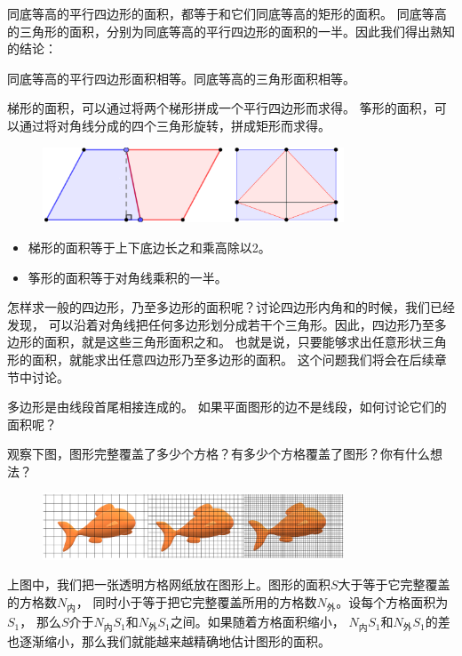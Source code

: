 \documentclass[12pt,UTF8]{ctexbook}
\begin{document}
同底等高的平行四边形的面积，都等于和它们同底等高的矩形的面积。
同底等高的三角形的面积，分别为同底等高的平行四边形的面积的一半。因此我们得出熟知的结论：
\begin{tm}
    同底等高的平行四边形面积相等。同底等高的三角形面积相等。
\end{tm}

梯形的面积，可以通过将两个梯形拼成一个平行四边形而求得。
筝形的面积，可以通过将对角线分成的四个三角形旋转，拼成矩形而求得。

\begin{figure}[H] 
    \vspace{4pt}
    \centering
    \includegraphics[width=0.8\textwidth]{tu/面积_梯形1.png}
\end{figure}

\begin{itemize}
    \item 梯形的面积等于上下底边长之和乘高除以2。
    \item 筝形的面积等于对角线乘积的一半。
\end{itemize}

怎样求一般的四边形，乃至多边形的面积呢？讨论四边形内角和的时候，我们已经发现，
可以沿着对角线把任何多边形划分成若干个三角形。因此，四边形乃至多边形的面积，就是这些三角形面积之和。
也就是说，只要能够求出任意形状三角形的面积，就能求出任意四边形乃至多边形的面积。
这个问题我们将会在后续章节中讨论。

多边形是由线段首尾相接连成的。
如果平面图形的边不是线段，如何讨论它们的面积呢？

观察下图，图形完整覆盖了多少个方格？有多少个方格覆盖了图形？你有什么想法？

\begin{figure}[H] 
    \vspace{4pt}
    \centering
    \includegraphics[width=0.8\textwidth]{tu/面积_鱼1.png}
\end{figure}

上图中，我们把一张透明方格网纸放在图形上。图形的面积$S$大于等于它完整覆盖的方格数$N_{\text{内}}$，
同时小于等于把它完整覆盖所用的方格数$N_{\text{外}}$。设每个方格面积为$S_1$，
那么$S$介于$N_{\text{内}}S_1$和$N_{\text{外}}S_1$之间。如果随着方格面积缩小，
$N_{\text{内}}S_1$和$N_{\text{外}}S_1$的差也逐渐缩小，那么我们就能越来越精确地估计图形的面积。
\end{document}
